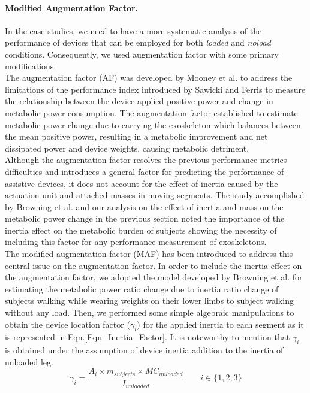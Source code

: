 \documentclass[10pt,letterpaper]{article}
\begin{document}
\paragraph*{Modified Augmentation Factor.}In the case studies, we need to have a more systematic analysis of the performance of devices that can be employed for both {\it loaded} and {\it noload} conditions. Consequently, we used augmentation factor \cite{41} with some primary modifications.\\
The augmentation factor (AF) was developed by Mooney et al. \cite{41} to address the limitations of the performance index introduced by Sawicki and Ferris \cite{149} to measure the relationship between the device applied positive power and change in metabolic power consumption. The augmentation factor established to estimate metabolic power change due to carrying the exoskeleton which balances between the mean positive power, resulting in a metabolic improvement and net dissipated power and device weights, causing metabolic detriment.\\
Although the augmentation factor resolves the previous performance metrics difficulties and introduces a general factor for predicting the performance of assistive devices, it does not account for the effect of inertia caused by the actuation unit and attached masses in moving segments. The study accomplished by Browning et al. \cite{133} and our analysis on the effect of inertia and mass on the metabolic power change in the previous section noted the importance of the inertia effect on the metabolic burden of subjects showing the necessity of including this factor for any performance measurement of exoskeletons.\\
The modified augmentation factor (MAF) has been introduced to address this central issue on the augmentation factor. In order to include the inertia effect on the augmentation factor, we adopted the model developed by Browning et al. \cite {133} for estimating the metabolic power ratio change due to inertia ratio change of subjects walking while wearing weights on their lower limbs to subject walking without any load. Then, we performed some simple algebraic manipulations to obtain the device location factor ($\gamma_{i}$) for the applied inertia to each segment as it is represented in Eqn.\eqref{Eqn_Inertia_Factor}. It is noteworthy to mention that $\gamma_{i}$ is obtained under the assumption of device inertia addition to the inertia of unloaded leg.
\begin{equation}\label{Eqn_Inertia_Factor}
	\gamma_{i} = \frac{A_i\times m_{subjects}\times MC_{unloaded}}{I_{unloaded}} \qquad i \in \{1,2,3\}
\end{equation}
\end{document}
